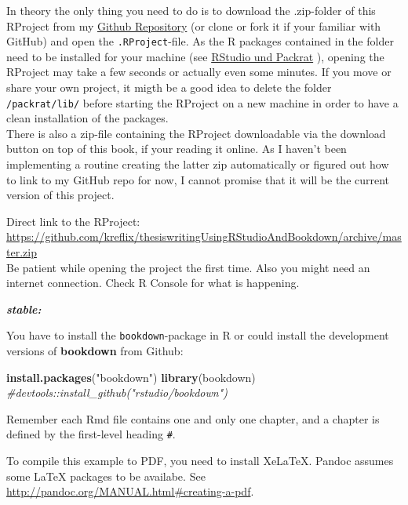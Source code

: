 \documentclass[]{book}
\makeatletter
\newenvironment{Shaded}{\begin{snugshade}}{\end{snugshade}}
\newcommand{\KeywordTok}[1]{\textcolor[rgb]{0.13,0.29,0.53}{\textbf{{#1}}}}
\newcommand{\StringTok}[1]{\textcolor[rgb]{0.31,0.60,0.02}{{#1}}}
\newcommand{\CommentTok}[1]{\textcolor[rgb]{0.56,0.35,0.01}{\textit{{#1}}}}
\newcommand{\NormalTok}[1]{{#1}}
\newenvironment{kframe}{%
\medskip{}
\setlength{\fboxsep}{.8em}
 \def\at@end@of@kframe{}%
 \ifinner\ifhmode%
  \def\at@end@of@kframe{\end{minipage}}%
  \begin{minipage}{\columnwidth}%
 \fi\fi%
 \def\FrameCommand##1{\hskip\@totalleftmargin \hskip-\fboxsep
 \colorbox{shadecolor}{##1}\hskip-\fboxsep
     \hskip-\linewidth \hskip-\@totalleftmargin \hskip\columnwidth}%
 \MakeFramed {\advance\hsize-\width
   \@totalleftmargin\z@ \linewidth\hsize
   \@setminipage}}%
 {\par\unskip\endMakeFramed%
 \at@end@of@kframe}
\renewenvironment{Shaded}{\begin{kframe}}{\end{kframe}}
\theoremstyle{definition}
\theoremstyle{definition}
\theoremstyle{remark}
\let\BeginKnitrBlock\begin \let\EndKnitrBlock\end
\makeatother
\begin{document}
In theory the only thing you need to do is to download the .zip-folder
of this RProject from my
\href{https://github.com/kreflix/thesiswritingUsingRStudioAndBookdown}{Github
Repository} (or clone or fork it if your familiar with GitHub) and open
the \texttt{.RProject}-file. As the R packages contained in the folder
need to be installed for your machine (see
\protect\hyperlink{rstudio-und-packrat}{RStudio und Packrat} ), opening
the RProject may take a few seconds or actually even some minutes. If
you move or share your own project, it migth be a good idea to delete
the folder \texttt{/packrat/lib/} before starting the RProject on a new
machine in order to have a clean installation of the packages.\\
There is also a zip-file containing the RProject downloadable via the
download button on top of this book, if your reading it online. As I
haven't been implementing a routine creating the latter zip
automatically or figured out how to link to my GitHub repo for now, I
cannot promise that it will be the current version of this project.

\BeginKnitrBlock{rmdimportant}
Direct link to the RProject:\\
\url{https://github.com/kreflix/thesiswritingUsingRStudioAndBookdown/archive/master.zip}\\
Be patient while opening the project the first time. Also you might need
an internet connection. Check R Console for what is happening.
\EndKnitrBlock{rmdimportant}

\textbf{\emph{stable:}}

You have to install the \texttt{bookdown}-package in R or could install
the development versions of \textbf{bookdown} from Github:

\begin{Shaded}
\begin{Highlighting}[]
\KeywordTok{install.packages}\NormalTok{(}\StringTok{"bookdown"}\NormalTok{)}
\KeywordTok{library}\NormalTok{(bookdown)}
\CommentTok{#devtools::install_github("rstudio/bookdown")}
\end{Highlighting}
\end{Shaded}

Remember each Rmd file contains one and only one chapter, and a chapter
is defined by the first-level heading \texttt{\#}.

To compile this example to PDF, you need to install XeLaTeX. Pandoc
assumes some LaTeX packages to be availabe. See
\url{http://pandoc.org/MANUAL.html\#creating-a-pdf}.
\end{document}
